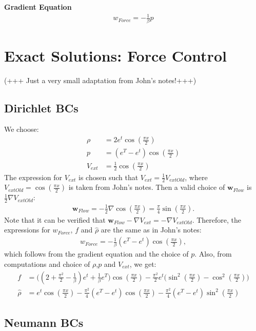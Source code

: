 \documentclass[11pt, a4paper]{article}
\theoremstyle{definition}
\newcommand{\Sta}{\rho}
\newcommand{\Adj}{p}
\begin{document}
\textbf{Gradient Equation}
\begin{align*}
{w}_{Force}=-\frac{1}{\beta}\Adj
\end{align*} 



\section*{Exact Solutions: Force Control}
(+++ Just a very small adaptation from John's notes!+++)

\subsection*{Dirichlet BCs}
We choose:
\begin{align*}
\Sta &= 2 e^t \cos(\frac{\pi x}{2})\\
\Adj &=(e^T-e^t) \cos(\frac{\pi x}{2})\\
V_{ext} &= \frac{1}{2} \cos(\frac{\pi x}{2})
\end{align*}
The expression for $V_{ext}$ is chosen such that $V_{ext}= \frac{1}{2}V_{extOld}  $, where $V_{extOld}=\cos(\frac{\pi x}{2})$ is taken from John's notes. Then a valid choice of $\mathbf{w}_{Flow}$ is  $\frac{1}{2} \nabla V_{extOld}$:
\begin{align*}
\mathbf{w}_{Flow}= -\frac{1}{2} \nabla \cos(\frac{\pi x}{2}) = \frac{\pi}{4} \sin(\frac{\pi x}{2}).
\end{align*}
Note that it can be verified that $ \mathbf{w}_{Flow} - \nabla V_{ext}= - \nabla V_{extOld}$.
Therefore, the expressions for $w_{Force}$, $f$ and $\hat \Sta$ are the same as in John's notes:
\begin{align*}
w_{Force}= -\frac{1}{\beta}(e^T - e^t)\cos(\frac{\pi x}{2}),
\end{align*}
which follows from the gradient equation and the choice of $\Adj$.
Also, from computations and choice of $\Sta$,$\Adj$ and $V_{ext}$, we get:
\begin{align*}
f&= \bigg( (2  + \frac{\pi^2}{2} -\frac{1}{\beta} )e^t  + \frac{1}{\beta}e^T  \bigg)\cos(\frac{\pi x}{2}) - \frac{\pi^2}{2}e^t \bigg( \sin^2(\frac{\pi x}{2}) - \cos^2(\frac{\pi x}{2})\bigg)\\
\hat \Sta &= e^t \cos(\frac{\pi x}{2})- \frac{\pi^2}{4}(e^T -e^t)\cos(\frac{\pi x}{2}) - \frac{\pi^2}{4}(e^T -e^t)\sin^2(\frac{\pi x}{2})
\end{align*}




\subsection*{Neumann BCs}
\end{document}
